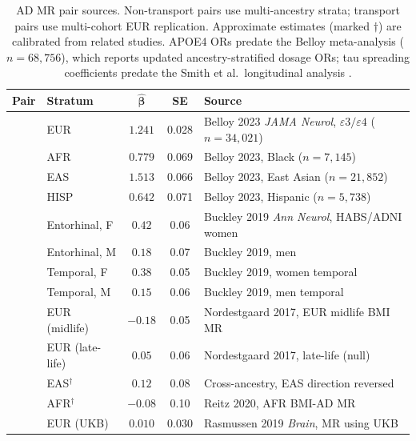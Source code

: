 \documentclass[11pt]{article}
\begin{document}
\begin{table}[h]
\centering
\caption{AD MR pair sources. Non-transport pairs use multi-ancestry strata; transport pairs use multi-cohort EUR replication. Approximate estimates (marked $\dagger$) are calibrated from related studies. APOE4 ORs predate the Belloy meta-analysis \citep{belloy2023apoe} ($n = 68{,}756$), which reports updated ancestry-stratified dosage ORs; tau spreading coefficients predate the Smith et al.\ longitudinal analysis \citep{smith2020tau}.}
\label{tab:mr-sources-ad}
\small
\begin{tabular}{@{}llccp{4.5cm}@{}}
\toprule
\textbf{Pair} & \textbf{Stratum} & $\boldsymbol{\hat\beta}$ & \textbf{SE} & \textbf{Source} \\
\midrule
{}
& EUR & $1.241$ & 0.028 & Belloy 2023 \emph{JAMA Neurol}, $\varepsilon3/\varepsilon4$ ($n = 34{,}021$) \\
& AFR & $0.779$ & 0.069 & Belloy 2023, Black ($n = 7{,}145$) \\
& EAS & $1.513$ & 0.066 & Belloy 2023, East Asian ($n = 21{,}852$) \\
& HISP & $0.642$ & 0.071 & Belloy 2023, Hispanic ($n = 5{,}738$) \\
\midrule
{}
& Entorhinal, F & $0.42$ & 0.06 & Buckley 2019 \emph{Ann Neurol}, HABS/ADNI women \\
& Entorhinal, M & $0.18$ & 0.07 & Buckley 2019, men \\
& Temporal, F & $0.38$ & 0.05 & Buckley 2019, women temporal \\
& Temporal, M & $0.15$ & 0.06 & Buckley 2019, men temporal \\
\midrule
{}
& EUR (midlife) & $-0.18$ & 0.05 & Nordestgaard 2017, EUR midlife BMI MR \\
& EUR (late-life) & $0.05$ & 0.06 & Nordestgaard 2017, late-life (null) \\
& EAS$^\dagger$ & $0.12$ & 0.08 & Cross-ancestry, EAS direction reversed \\
& AFR$^\dagger$ & $-0.08$ & 0.10 & Reitz 2020, AFR BMI-AD MR \\
\midrule
{}
& EUR (UKB) & $0.010$ & 0.030 & Rasmussen 2019 \emph{Brain}, MR using UKB \\

\end{tabular}
\end{table}
\end{document}
